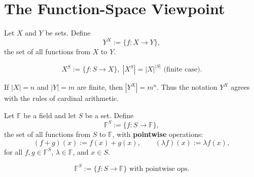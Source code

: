 
\section{The Function-Space Viewpoint}

\begin{definition}
\label{def:set-exponentiation}
Let $X$ and $Y$ be sets. Define
\[
Y^X := \{ f : X \to Y \},
\]
the set of all functions from $X$ to $Y$.
\end{definition}

\begin{remark*}
\[ X^S := \{f : S\to X\},\; |X^S|=|X|^{|S|}\text{ (finite case)}. \]
\end{remark*}

\begin{remark*}[Flash]
\end{remark*}

\begin{remark*}
If $|X| = n$ and $|Y| = m$ are finite, then $|Y^X| = m^n$.
Thus the notation $Y^X$ agrees with the rules of cardinal arithmetic.
\end{remark*}

\begin{definition}
\label{def:function-space}
Let $\mathbb{F}$ be a field and let $S$ be a set. Define
\[
\mathbb{F}^S := \{ f : S \to \mathbb{F} \},
\]
the set of all functions from $S$ to $\mathbb{F}$, with \textbf{pointwise} operations:
\[
(f + g)(x) := f(x) + g(x),
\qquad
(\lambda f)(x) := \lambda f(x),
\]
for all $f,g \in \mathbb{F}^S$, $\lambda \in \mathbb{F}$, and $x \in S$.
\end{definition}

\begin{remark*}
\[ \mathbb{F}^S := \{f:S\to\mathbb{F}\}\text{ with pointwise ops}. \]
\end{remark*}

\begin{remark*}[Flash]
\end{remark*}

